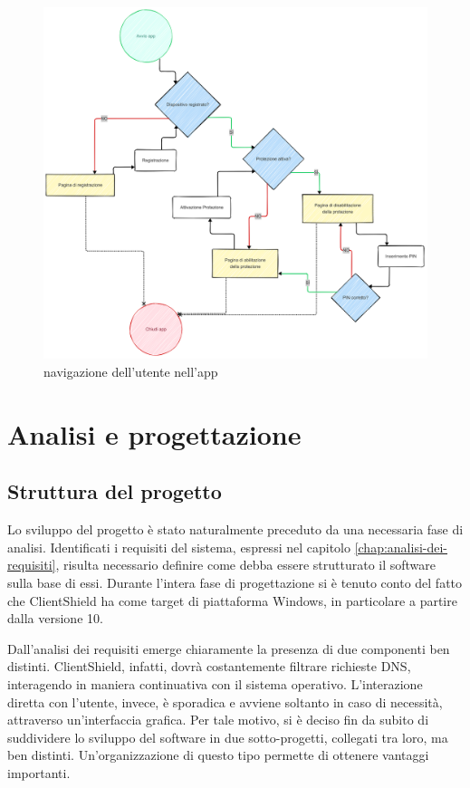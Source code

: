 \documentclass[12pt,a4paper,openright,twoside]{book}
\begin{document}
\begin{figure}[H]
	\centering
	\includegraphics[width=1.0\textwidth]{figures/schema-casi-uso.png}
	\caption{navigazione dell'utente nell'app}
	\label{fig:schema-casi-uso}
\end{figure}

\chapter{Analisi e progettazione}

\section{Struttura del progetto}

Lo sviluppo del progetto è stato naturalmente preceduto da una necessaria fase di analisi.
Identificati i requisiti del sistema, espressi nel capitolo \ref{chap:analisi-dei-requisiti}, risulta necessario definire come debba essere strutturato il software sulla base di essi.
Durante l'intera fase di progettazione si è tenuto conto del fatto che ClientShield ha come target di piattaforma Windows, in particolare a partire dalla versione 10.

Dall'analisi dei requisiti emerge chiaramente la presenza di due componenti ben distinti.
ClientShield, infatti, dovrà costantemente filtrare richieste \gls{DNS}, interagendo in maniera continuativa con il sistema operativo.
L'interazione diretta con l'utente, invece, è sporadica e avviene soltanto in caso di necessità, attraverso un'interfaccia grafica.
Per tale motivo, si è deciso fin da subito di suddividere lo sviluppo del software in due sotto-progetti, collegati tra loro, ma ben distinti.
Un'organizzazione di questo tipo permette di ottenere vantaggi importanti.
\end{document}
